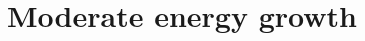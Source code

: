 \documentclass[10 pt,a4paper]{article}
\theoremstyle{definition}
\newtheorem{remark}[definition]{Remark}
\begin{document}
%
%
%



\section{Moderate energy growth}\label{sec_energy}
\end{document}
